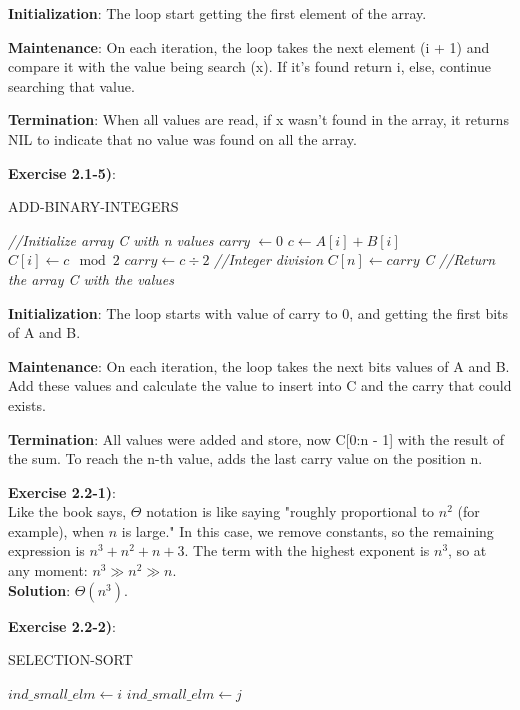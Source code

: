 \documentclass{article}
\newcounter{exercise}[section]   %
\begin{document}
\textbf{Initialization}: The loop start getting the first element of the array. 

\textbf{Maintenance}: On each iteration, the loop takes the next element (i + 1) and compare 
it with the value being search (x). If it's found return i, else, continue searching that 
value.

\textbf{Termination}: When all values are read, if x wasn't found in the array, it returns
NIL to indicate that no value was found on all the array.

\textbf{Exercise 2.1-5)}:\\
\begin{algorithm}
\caption{ADD-BINARY-INTEGERS}\label{AddBinarySearchID}
\begin{algorithmic}[1]
    \State \textit{//Initialize array C with n values}
    \State \textit{carry} $\gets 0$ 
        \State $c \gets A[i] + B[i]$
        \State $C[i] \gets c \mod 2$
        \State $carry \gets c \div 2$ \quad \textit{//Integer division}
    \EndFor
    \Statex
    \State $C[n] \gets carry$
    \State \Return \textit{C} \quad \textit{//Return the array C with the values}
\EndFunction
\end{algorithmic}
\end{algorithm}

\textbf{Initialization}: The loop starts with value of carry to 0, and getting the first 
bits of A and B.

\textbf{Maintenance}: On each iteration, the loop takes the next bits values of A and B.
Add these values and calculate the value to insert into C and the carry that could exists.

\textbf{Termination}: All values were added and store, now C[0:n - 1] with the result of 
the sum. To reach the n-th value, adds the last carry value on the position n.

\textbf{Exercise 2.2-1)}:\\
Like the book says, \(\Theta\) notation is like saying "roughly proportional to \(n^2\) (for example), 
when \(n\) is large." In this case, we remove constants, so the remaining expression is 
\(n^3 + n^2 + n + 3\). The term with the highest exponent is \(n^3\), so at any moment:
\(n^3 \gg n^2 \gg n\). \\ 
\textbf{Solution}: \(\Theta(n^3)\).

\textbf{Exercise 2.2-2)}:\\
\begin{algorithm}
\caption{SELECTION-SORT}\label{SelectionSortID}
\begin{algorithmic}[1]
        \State $ind\_small\_elm \gets i$
                \State $ind\_small\_elm \gets j$
            \EndIf
        \EndFor
        \State {}
    \EndFor
\EndFunction
\end{algorithmic}
\end{algorithm}
\end{document}
